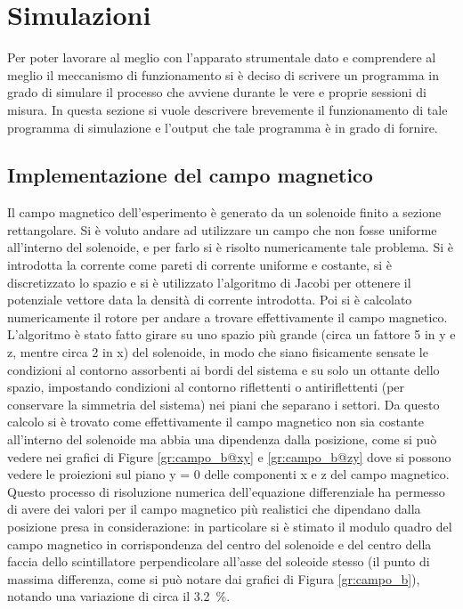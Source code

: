 \section{Simulazioni}
Per poter lavorare al meglio con l'apparato strumentale dato e comprendere al meglio il meccanismo di funzionamento si è deciso di scrivere un programma in grado di simulare
il processo che avviene durante le vere e proprie sessioni di misura. In questa sezione si vuole descrivere brevemente il funzionamento di tale programma di simulazione e
l'output che tale programma è in grado di fornire.







\subsection{Implementazione del campo magnetico}
Il campo magnetico dell'esperimento è generato da un solenoide finito a sezione rettangolare. 
Si è voluto andare ad utilizzare un campo che non fosse uniforme all'interno del solenoide, e per farlo si è risolto numericamente tale problema. 
Si è introdotta la corrente come pareti di corrente uniforme e costante, si è discretizzato lo spazio e si è utilizzato l'algoritmo di Jacobi per ottenere il potenziale vettore data la densità di corrente introdotta. 
Poi si è calcolato numericamente il rotore per andare a trovare effettivamente il campo magnetico. 
L'algoritmo è stato fatto girare su uno spazio più grande (circa un fattore 5 in y e z, mentre circa 2 in x) del solenoide, in modo che siano fisicamente sensate le condizioni al contorno assorbenti ai bordi del sistema e su solo un ottante dello spazio, impostando condizioni al contorno riflettenti o antiriflettenti (per conservare la simmetria del sistema) nei piani che separano i settori. Da questo calcolo si è trovato come effettivamente il campo magnetico non sia costante all'interno del solenoide ma abbia una dipendenza dalla posizione, come si può vedere nei grafici di Figure \ref{gr:campo_b@xy} e \ref{gr:campo_b@zy} dove si possono vedere le proiezioni sul piano y = 0 delle componenti x e z del campo magnetico. 
Questo processo di risoluzione numerica dell'equazione differenziale ha permesso di avere dei valori per il campo magnetico più realistici che dipendano dalla posizione presa in considerazione: in particolare si \`e stimato il modulo quadro del campo magnetico in corrispondenza del centro del solenoide e del centro della faccia dello scintillatore perpendicolare all'asse del soleoide stesso (il punto di massima differenza, come si pu\`o notare dai grafici di Figura \ref{gr:campo_b}), notando una variazione di circa il \SI{3.2}{\percent}. 

